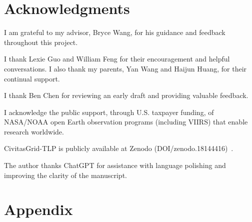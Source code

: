 \documentclass[11pt,conference,onecolumn]{IEEEtran}
\begin{document}
\section*{Acknowledgments}
I am grateful to my advisor, Bryce Wang, for his guidance and feedback throughout this project.

I thank Lexie Guo and William Feng for their encouragement and helpful conversations. I also thank my parents, Yan Wang and Haijun Huang, for their continual support.

I thank Ben Chen for reviewing an early draft and providing valuable feedback.

I acknowledge the public support, through U.S. taxpayer funding, of NASA/NOAA open Earth observation programs (including VIIRS) that enable research worldwide.

CivitasGrid-TLP is publicly available at Zenodo (DOI/zenodo.18144416)~\cite{huang_2026_18144416}.

The author thanks ChatGPT for assistance with language polishing and improving the clarity of the manuscript.
% 



\onecolumn

\section{Appendix}
\end{document}
